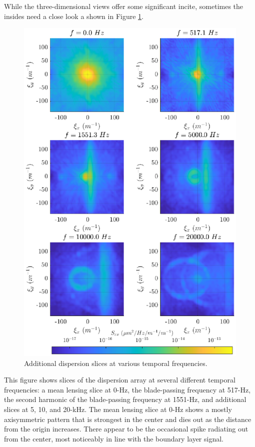 While the three-dimensional views offer some significant incite, sometimes the insides need a close look a shown in Figure \ref{fig:04_dispersion_slices}.
\begin{figure}
  \centering
  \includegraphics{../matlab/04_dispersion_analysis/dispersion_slices.eps}
  \caption{Additional dispersion slices at various temporal frequencies.}
  \label{fig:04_dispersion_slices}
\end{figure}
This figure shows slices of the dispersion array at several different temporal frequencies: a mean lensing slice at 0-Hz, the blade-passing frequency at 517-Hz, the second harmonic of the blade-passing frequency at 1551-Hz, and additional slices at 5, 10, and 20-kHz.
The mean lensing slice at 0-Hz shows a mostly axisymmetric pattern that is strongest in the center and dies out as the distance from the origin increases.
There appear to be the occasional spike radiating out from the center, most noticeably in line with the boundary layer signal.

